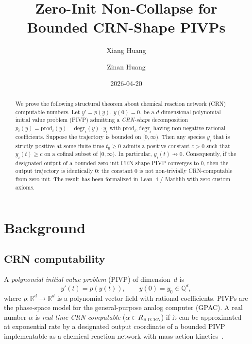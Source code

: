 \documentclass[11pt]{article}
\title{Zero-Init Non-Collapse for Bounded CRN-Shape PIVPs}
\author{Xiang Huang \and Zinan Huang}
\date{2026-04-20}
\newcommand{\R}{\mathbb{R}}
\newcommand{\Q}{\mathbb{Q}}
\newcommand{\RTCRN}{R_{\mathrm{RTCRN}}}
\newcommand{\prodpoly}{\mathrm{prod}}
\newcommand{\degrpoly}{\mathrm{degr}}
\begin{document}
\maketitle

\begin{abstract}
We prove the following structural theorem about chemical reaction network (CRN)
computable numbers. Let $y' = p(y)$, $y(0) = 0$, be a $d$-dimensional polynomial
initial value problem (PIVP) admitting a \emph{CRN-shape} decomposition
$p_i(y) = \prodpoly_i(y) - \degrpoly_i(y)\cdot y_i$ with
$\prodpoly_i, \degrpoly_i$ having non-negative rational coefficients. Suppose
the trajectory is bounded on $[0, \infty)$. Then any species $y_i$ that is
strictly positive at some finite time $t_0 \ge 0$ admits a positive constant
$c > 0$ such that $y_i(t) \ge c$ on a cofinal subset of $[0, \infty)$. In
particular, $y_i(t) \not\to 0$. Consequently, if the designated output of a
bounded zero-init CRN-shape PIVP converges to $0$, then the output trajectory
is identically $0$: the constant $0$ is not non-trivially CRN-computable from
zero init. The result has been formalized in Lean~4 / Mathlib with zero custom
axioms.
\end{abstract}

\section{Background}

\subsection{CRN computability}

A \emph{polynomial initial value problem} (PIVP) of dimension~$d$ is
\begin{equation}\label{eq:pivp}
  y'(t) = p(y(t)), \qquad y(0) = y_0 \in \Q^d,
\end{equation}
where $p\colon \R^d \to \R^d$ is a polynomial vector field with rational
coefficients. PIVPs are the phase-space model for the general-purpose analog
computer (GPAC). A real number $\alpha$ is \emph{real-time CRN-computable}
($\alpha \in \RTCRN$) if it can be approximated at exponential rate by a
designated output coordinate of a bounded PIVP implementable as a chemical
reaction network with mass-action kinetics~\cite{RTCRN1,RTCRN2,LPP}.
\end{document}
